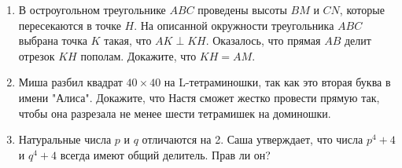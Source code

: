 \documentclass{article}
\begin{document}
\begin{enumerate}

\item В остроугольном треугольнике $ABC$ проведены высоты $BM$ и $CN$, которые пересекаются в точке $H$. На описанной окружности треугольника $ABC$ выбрана точка $K$ такая, что $AK \perp KH$. Оказалось, что прямая $AB$ делит отрезок $KH$ пополам. Докажите, что $KH =AM$.

\item Миша разбил квадрат $40 \times 40$ на L-тетраминошки, так как это вторая буква в имени "Алиса". Докажите, что Настя сможет жестко провести прямую так, чтобы она разрезала не менее шести тетрамишек на доминошки.

\item Натуральные числа $p$ и $q$ отличаются на 2. Саша утверждает, что числа $p^4 + 4$ и $q^4 + 4$ всегда имеют общий делитель. Прав ли он?


\end{enumerate}
\end{document}
